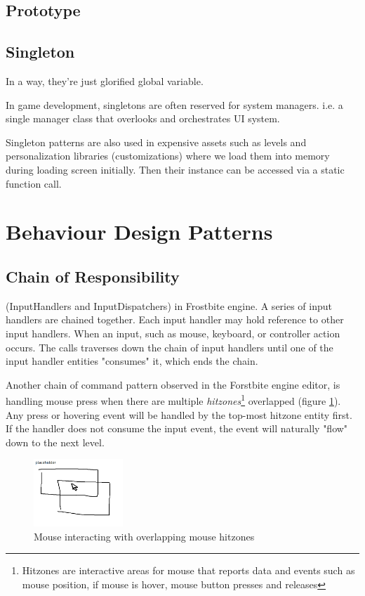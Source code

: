 \documentclass[10pt,letterpaper]{article}
\newcommand{\bs}{\bigskip}
\begin{document}
\begin{multicols}{2}
\subsection{Prototype}

\subsection{Singleton}

In a way, they're just glorified global variable.

In game development, singletons are often reserved for system managers. i.e. a single manager class that overlooks and orchestrates UI system.

Singleton patterns are also used in expensive assets such as levels and personalization libraries (customizations) where we load them into memory during loading screen initially. Then their instance can be accessed via a static function call.

\section{Behaviour Design Patterns}

\subsection{Chain of Responsibility}

(InputHandlers and InputDispatchers) in Frostbite engine. A series of input handlers are chained together. Each input handler may hold reference to other input handlers.
\bs
When an input, such as mouse, keyboard, or controller action occurs. The calls traverses down the chain of input handlers until one of the input handler entities "consumes" it, which ends the chain.
\bs

Another chain of command pattern observed in the Forstbite engine editor, is handling mouse press when there are multiple \textit{hitzones}\footnote{Hitzones are interactive areas for mouse that reports data and events such as mouse position, if mouse is hover, mouse button presses and releases} overlapped (figure \ref{fig:chainofcommand-mousezones}). Any press or hovering event will be handled by the top-most hitzone entity first. If the handler does not consume the input event, the event will naturally "flow" down to the next level.
\bs

\begin{figure}[H]
	\centering
	\includegraphics[width=0.3\textwidth]{assets/chainofcommand_mousezones}
	\caption{Mouse interacting with overlapping mouse hitzones}
	\label{fig:chainofcommand-mousezones}
\end{figure}


\end{multicols}
\end{document}
